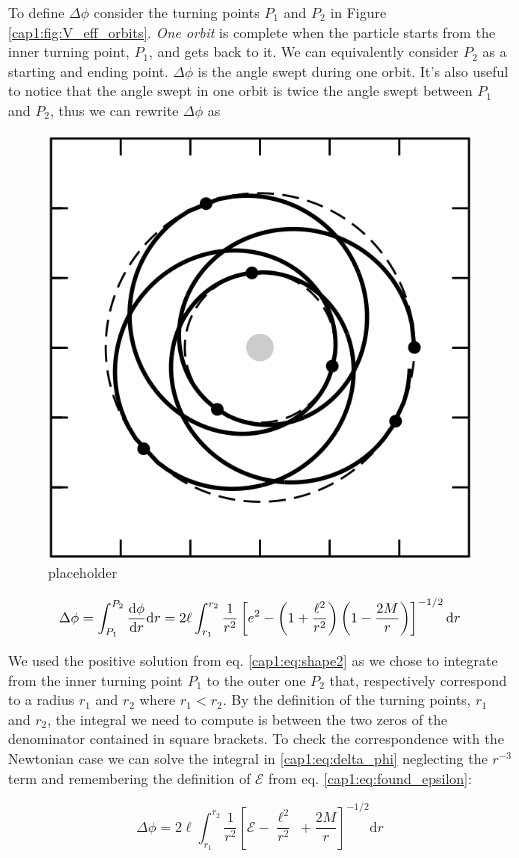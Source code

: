 To define $\Delta \phi$ consider the turning points $P_1$ and $P_2$ in Figure
\ref{cap1:fig:V_eff_orbits}.
\textit{One orbit} is complete when the particle starts from the inner turning
point, $P_1$, and gets back to it.
We can equivalently consider $P_2$ as a starting and ending point.
$\Delta \phi$ is the angle swept during one orbit.
It's also useful to notice that the angle swept in one orbit is twice the angle
swept between $P_1$ and $P_2$, thus we can rewrite $\Delta \phi$ as

\begin{figure}[h]
    \centering
    \includegraphics[width = 0.5 \textwidth]{Figures/precession_bozza.png}
    \caption{placeholder}
    \label{cap1:fig:precession}
\end{figure}

\begin{equation}
    \Delta \phi = \int_{P_1}^{P_2} \dv{\phi}{r} \mathrm{d}r
    = 2 \ell \int_{r_1}^{r_2} \frac{1}{r^2}
    \left[e^2 - \left(1 + \frac{\ell^2}{r^2}\right)
    \left(1 - \frac{2M}{r}\right)\right]^{-1/2} \mathrm{d}r
    \label{cap1:eq:delta_phi}
\end{equation}

We used the positive solution from eq. \ref{cap1:eq:shape2} as we chose to
integrate from the inner turning point $P_1$ to the outer one $P_2$ that,
respectively correspond to a radius $r_1$ and $r_2$ where $r_1 < r_2$.
By the definition of the turning points, $r_1$ and $r_2$, the integral we need
to compute is between the two zeros of the denominator contained in square
brackets.
To check the correspondence with the Newtonian case we can solve the integral
in \ref{cap1:eq:delta_phi} neglecting the $r^{-3}$ term and remembering the
definition of $\mathcal E$ from eq. \ref{cap1:eq:found_epsilon}:

\begin{equation*}
    \Delta \phi = 2 \ell \int_{r_1}^{r_2} \frac{1}{r^2} \left[\mathcal E -
    \frac{\ell^2}{r^2}\ + \frac{2M}{r} \right]^{-1/2} \mathrm{d}r
\end{equation*}

